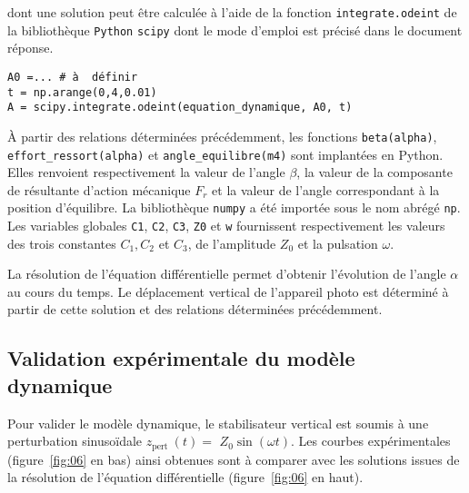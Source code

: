 dont une solution peut être calculée à l'aide de la fonction \texttt{integrate.odeint} de la bibliothèque \texttt{Python} \texttt{scipy} dont le mode d'emploi est précisé dans le document réponse. 

\begin{lstlisting}
A0 =... # à  définir
t = np.arange(0,4,0.01)
A = scipy.integrate.odeint(equation_dynamique, A0, t)
\end{lstlisting}

À partir des relations déterminées précédemment, les fonctions \texttt{beta(alpha)}, \texttt{effort\_ressort(alpha)} et \texttt{angle\_equilibre(m4)} sont implantées en Python. Elles renvoient respectivement la valeur de l'angle $\beta$, la valeur de la composante de résultante d'action mécanique $F_{r}$ et la valeur de l'angle correspondant à la position d'équilibre. La bibliothèque \texttt{numpy} a été importée sous le nom abrégé \texttt{np}. Les variables globales \texttt{C1}, \texttt{C2}, \texttt{C3}, \texttt{Z0} et \texttt{w} fournissent respectivement les valeurs des trois constantes $C_{1}, C_{2}$ et $C_{3}$, de l'amplitude $Z_{0}$ et la pulsation $\omega$.

\ifprof
\begin{corrige}
\end{corrige}
\else
\fi

\ifprof
\begin{corrige}
\end{corrige}
\else
\fi

La résolution de l'équation différentielle permet d'obtenir l'évolution de l'angle $\alpha$ au cours du temps. Le déplacement vertical de l'appareil photo est déterminé à partir de cette solution et des relations déterminées précédemment.

\subsection{Validation expérimentale du modèle dynamique}
Pour valider le modèle dynamique, le stabilisateur vertical est soumis à une perturbation sinusoïdale $z_{\text {pert }}(t)=$ $Z_{0} \sin (\omega t)$. Les courbes expérimentales (figure~\ref{fig:06} en bas) ainsi obtenues sont à comparer avec les solutions issues de la résolution de l'équation différentielle (figure~\ref{fig:06} en haut).

